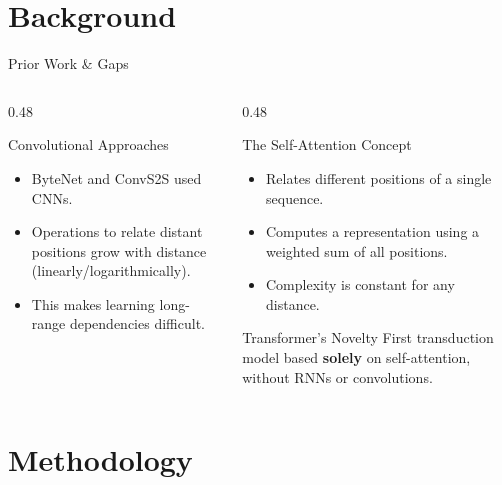 \documentclass[
	11pt,
	aspectratio=169,
]{beamer}
\begin{document}
\section{Background}



\begin{frame}{Prior Work \& Gaps}
    \begin{columns}[T,onlytextwidth]
    \begin{column}{0.48\textwidth}
        \begin{block}{Convolutional Approaches}
            \begin{itemize}
                \item ByteNet and ConvS2S used CNNs.
                \item Operations to relate distant positions grow with distance (linearly/logarithmically).
                \item This makes learning long-range dependencies difficult.
            \end{itemize}
        \end{block}
    \end{column}
    \begin{column}{0.48\textwidth}
        \begin{block}{The Self-Attention Concept}
            \begin{itemize}
                \item Relates different positions of a single sequence.
                \item Computes a representation using a weighted sum of all positions.
                \item Complexity is constant for any distance.
            \end{itemize}
        \end{block}
        \begin{alertblock}{Transformer's Novelty}
            First transduction model based \textbf{solely} on self-attention, without RNNs or convolutions.
        \end{alertblock}
    \end{column}
\end{columns}
\end{frame}



\section{Methodology}
\end{document}
